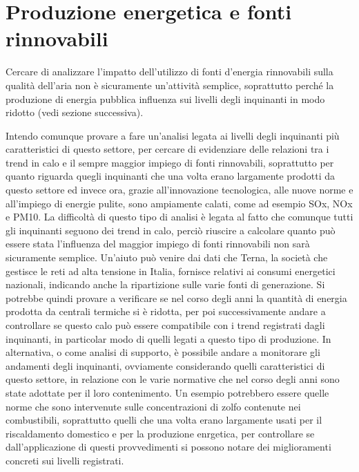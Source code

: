 \documentclass{article}
\begin{document}
\section{Produzione energetica e fonti rinnovabili}
\label{sec:energia}
Cercare di analizzare l'impatto dell'utilizzo di fonti d'energia rinnovabili sulla qualità dell'aria non è sicuramente un'attività semplice, soprattutto perché la produzione di energia pubblica influenza sui livelli degli inquinanti in modo ridotto (vedi sezione successiva).

Intendo comunque provare a fare un'analisi legata ai livelli degli inquinanti più caratteristici di questo settore, per cercare di evidenziare delle relazioni tra i trend in calo e il sempre maggior impiego di fonti rinnovabili, soprattutto per quanto riguarda quegli inquinanti che una volta erano largamente prodotti da questo settore ed invece ora, grazie all'innovazione tecnologica, alle nuove norme e all'impiego di energie pulite, sono ampiamente calati, come ad esempio SOx, NOx e PM10.
La difficoltà di questo tipo di analisi è legata al fatto che comunque tutti gli inquinanti seguono dei trend in calo, perciò riuscire a calcolare quanto può essere stata l'influenza del maggior impiego di fonti rinnovabili non sarà sicuramente semplice. Un'aiuto può venire dai dati che Terna, la società che gestisce le reti ad alta tensione in Italia, fornisce relativi ai consumi energetici nazionali, indicando anche la ripartizione sulle varie fonti di generazione. Si potrebbe quindi provare a verificare se nel corso degli anni la quantità di energia prodotta da centrali termiche si è ridotta, per poi successivamente andare a controllare se questo calo può essere compatibile con i trend registrati dagli inquinanti, in particolar modo di quelli legati a questo tipo di produzione. In alternativa, o come analisi di supporto, è possibile andare a monitorare gli andamenti degli inquinanti, ovviamente considerando quelli caratteristici di questo settore, in relazione con le varie normative che nel corso degli anni sono state adottate per il loro contenimento. Un esempio potrebbero essere quelle norme che sono intervenute sulle concentrazioni di zolfo contenute nei combustibili, soprattutto quelli che una volta erano largamente usati per il riscaldamento domestico e per la produzione enrgetica, per controllare se dall'applicazione di questi provvedimenti si possono notare dei miglioramenti concreti sui livelli registrati. 
\end{document}
